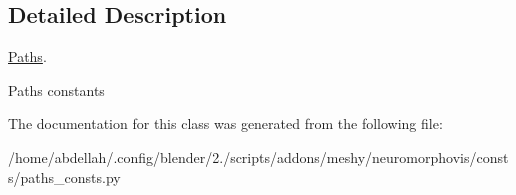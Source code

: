 \subsection{Detailed Description}
\hyperlink{classmeshy_1_1neuromorphovis_1_1consts_1_1paths__consts_1_1Paths}{Paths}. 

\begin{DoxyVerb}Paths constants
\end{DoxyVerb}
 

The documentation for this class was generated from the following file\+:\begin{DoxyCompactItemize}
\item 
/home/abdellah/.\+config/blender/2./scripts/addons/meshy/neuromorphovis/consts/paths\+\_\+consts.\+py\end{DoxyCompactItemize}
